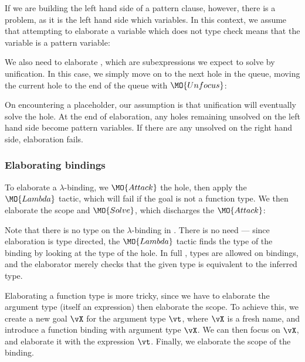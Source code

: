 If we are building the left hand side of a pattern clause, however, there is a
problem, as it is the left hand side which  variables. In this
context, we assume that attempting to elaborate a variable which does not type
check means that the variable is a pattern variable:


We also need to elaborate , which are subexpressions we expect to
solve by unification. In this case, we simply move on to the next hole in the queue, moving
the current hole to the end of the queue with $\MO{Unfocus}$:


On encountering a placeholder, our assumption is that unification will eventually solve
the hole. At the end of elaboration, any holes remaining unsolved on the left hand side
become pattern variables. If there are any unsolved on the right hand side, elaboration
fails.

\subsubsection{Elaborating bindings}

To elaborate a $\lambda$-binding, we $\MO{Attack}$ the hole, then apply the
$\MO{Lambda}$ tactic, which will fail if the goal is not a function type. We
then elaborate the scope and $\MO{Solve}$, which discharges the $\MO{Attack}$:


Note that there is no type on the $\lambda$-binding in \IdrisM{}. There is no need --- since
elaboration is type directed, the $\MO{Lambda}$ tactic finds the type of the binding by
looking at the type of the hole. In full \Idris{}, types are allowed on bindings, and the
elaborator merely checks that the given type is equivalent to the inferred type.

Elaborating a function type is more tricky, since we have to elaborate the argument
type (itself an \IdrisM{} expression) then elaborate the scope. To achieve this, we
create a new goal $\vX$ for the argument type $\vt$, where $\vX$ is a fresh name,
and introduce a function binding with argument type $\vX$. We can then focus on
$\vX$, and elaborate it with the expression $\vt$. Finally, we elaborate the
scope of the binding.

